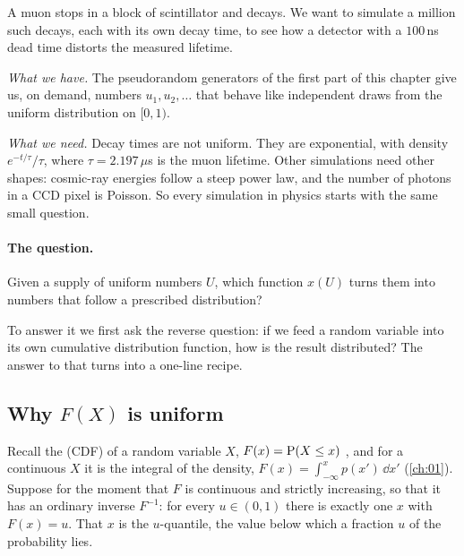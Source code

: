A muon stops in a block of scintillator and decays. We want to simulate a
million such decays, each with its own decay time, to see how a detector with a
$100\,$ns dead time distorts the measured lifetime.

\emph{What we have.} The pseudorandom generators of the first part of this
chapter give us, on demand, numbers $u_1,u_2,\dots$ that behave like independent
draws from the uniform distribution on $[0,1)$.

\emph{What we need.} Decay times are not uniform. They are exponential, with
density $e^{-t/\tau}/\tau$, where $\tau=2.197\,\mu$s is the muon lifetime. Other
simulations need other shapes: cosmic-ray energies follow a steep power law, and
the number of photons in a CCD pixel is Poisson. So every simulation in physics
starts with the same small question.

\paragraph{The question.} Given a supply of uniform numbers $U$, which function
$x(U)$ turns them into numbers that follow a prescribed distribution?

To answer it we first ask the reverse question: if we feed a random variable into
its own cumulative distribution function, how is the result distributed? The
answer to that turns into a one-line recipe.

\subsection{Why $F(X)$ is uniform}
\label{6b:sec:pit}

Recall the  (CDF) of a random variable
$X$, $F(x)=\operatorname{P}(X\le x)$ , and for a continuous $X$ it is the integral of
the density, $F(x)=\int_{-\infty}^x p(x')\,\dd x'$ (\cref{ch:01}). Suppose for the
moment that $F$ is continuous and strictly increasing, so that it has an ordinary
inverse $F^{-1}$: for every $u\in(0,1)$ there is exactly one $x$ with $F(x)=u$.
That $x$ is the $u$-quantile, the value below which a fraction $u$ of the
probability lies.

